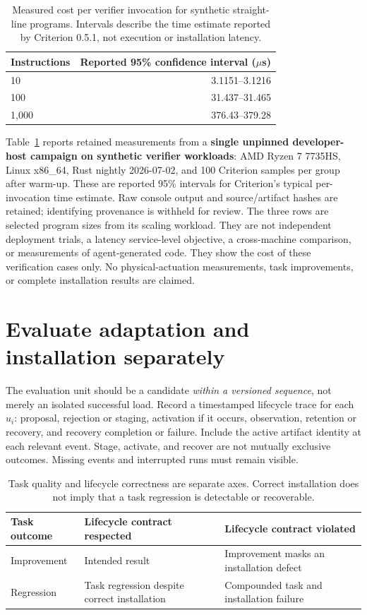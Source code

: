 \documentclass{article}
\begin{document}
\begin{table}[t]
\centering
\caption{Measured cost per verifier invocation for synthetic straight-line programs. Intervals describe the time estimate reported by Criterion 0.5.1, not execution or installation latency.}
\label{tab:verifier}
\begin{tabular}{lr}
\toprule
Instructions & Reported 95\% confidence interval ($\mu$s)\\
\midrule
10 & 3.1151--3.1216\\
100 & 31.437--31.465\\
1,000 & 376.43--379.28\\
\bottomrule
\end{tabular}
\end{table}

Table~\ref{tab:verifier} reports retained measurements from a \textbf{single unpinned developer-host campaign on synthetic verifier workloads}: AMD Ryzen 7 7735HS, Linux x86\_64, Rust nightly 2026-07-02, and 100 Criterion samples per group after warm-up. These are reported 95\% intervals for Criterion's typical per-invocation time estimate. Raw console output and source/artifact hashes are retained; identifying provenance is withheld for review. The three rows are selected program sizes from its scaling workload. They are not independent deployment trials, a latency service-level objective, a cross-machine comparison, or measurements of agent-generated code. They show the cost of these verification cases only. No physical-actuation measurements, task improvements, or complete installation results are claimed.

\section{Evaluate adaptation and installation separately}
\label{sec:evaluation}
The evaluation unit should be a candidate \emph{within a versioned sequence}, not merely an isolated successful load. Record a timestamped lifecycle trace for each $u_i$: proposal, rejection or staging, activation if it occurs, observation, retention or recovery, and recovery completion or failure. Include the active artifact identity at each relevant event. Stage, activate, and recover are not mutually exclusive outcomes. Missing events and interrupted runs must remain visible.

\begin{table}[t]
\centering
\caption{Task quality and lifecycle correctness are separate axes. Correct installation does not imply that a task regression is detectable or recoverable.}
\label{tab:axes}
\small
\begin{tabularx}{\linewidth}{@{}lXX@{}}
\toprule
Task outcome & Lifecycle contract respected & Lifecycle contract violated\\
\midrule
Improvement & Intended result & Improvement masks an installation defect\\
Regression & Task regression despite correct installation & Compounded task and installation failure\\
\bottomrule
\end{tabularx}
\end{table}
\end{document}
